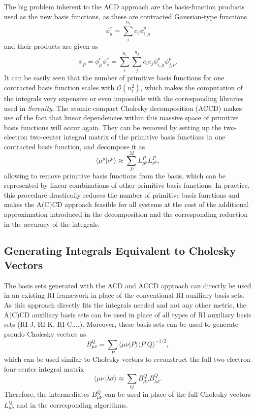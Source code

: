 The big problem inherent to the ACD approach are the basis-function products used as the new basis functions, as these are contracted Gaussian-type functions 
\begin{equation}
\phi_\mu^c = \sum_i^{n_i} c_i \phi_{i,\mu}^p 
\end{equation}
and their products are given as
\begin{equation}
\phi_P = \phi_\mu^c \phi_\nu^c = \sum_i^{n_i} \sum_j^{n_j} c_i c_j \phi_{i,\mu}^p \phi_{j,\nu}^p .
\end{equation}
It can be easily seen that the number of primitive basis functions for one contracted basis function scales with $\mathcal{O}(n_i^2)$, which makes the computation of the integrals very expensive or even impossible with the corresponding libraries used in \textit{Serenity}. 
The atomic compact Cholesky decomposition (ACCD) makes use of the fact that linear dependencies within this massive space of primitive basis functions will occur again. They can be removed by setting up the two-electron two-center integral matrix of the primitive basis functions in one contracted basis function, and decompose it as
\begin{equation}
\langle	\mu^p | \nu^p \rangle \approx \sum_P^M L^P_{\mu^p} L^P_{\nu^p} ,
\end{equation}
allowing to remove primitive basis functions from the basis, which can be represented by linear combinations of other primitive basis functions. In practice, this procedure drastically reduces the number of primitive basis functions and makes the A(C)CD approach feasible for all systems at the cost of the additional approximation introduced in the decomposition and the corresponding reduction in the accuracy of the integrals.


\subsection{Generating Integrals Equivalent to Cholesky Vectors}

The basis sets generated with the ACD and ACCD approach can directly be used in an existing RI framework in place of the conventional RI auxiliary basis sets. As this approach directly fits the integrals needed and not any other metric, the A(C)CD auxiliary basis sets can be used in place of all types of RI auxiliary basis sets (RI-J, RI-K, RI-C,...). Moreover, these basis sets can be used to generate pseudo Cholesky vectors as
\begin{equation}
B^Q_{\mu \nu} = \sum_{P} \langle \mu \nu | P \rangle \langle P | Q \rangle^{-1/2} ,
\end{equation}
which can be used similar to Cholesky vectors to reconstruct the full two-electron four-center integral matrix
\begin{equation}
\langle \mu \nu | \lambda \sigma \rangle \approx \sum_{Q} B^Q_{\mu \nu} B^Q_{\lambda \sigma}.
\end{equation} 
Therefore, the intermediates $B^Q_{\mu \nu}$ can be used in place of the full Cholesky vectors $L^Q_{\mu \nu}$ and in the corresponding algorithms.

